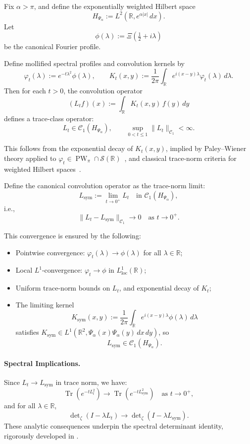 \begin{lemma}
\label{lem:trace_norm_convergence_Lt_to_Lsym}
Fix \( \alpha > \pi \), and define the exponentially weighted Hilbert space
\[
H_{\Psi_\alpha} := L^2(\mathbb{R}, e^{\alpha|x|}\, dx).
\]
Let
\[
\phi(\lambda) := \Xi\left( \tfrac{1}{2} + i\lambda \right)
\]
be the canonical Fourier profile.

Define mollified spectral profiles and convolution kernels by
\[
\varphi_t(\lambda) := e^{-t\lambda^2} \phi(\lambda), \qquad
K_t(x,y) := \frac{1}{2\pi} \int_{\mathbb{R}} e^{i(x - y)\lambda} \varphi_t(\lambda)\, d\lambda.
\]
Then for each \( t > 0 \), the convolution operator
\[
(L_t f)(x) := \int_{\mathbb{R}} K_t(x, y)\, f(y)\, dy
\]
defines a trace-class operator:
\[
L_t \in \mathcal{C}_1(H_{\Psi_\alpha}), \qquad \sup_{0 < t \le 1} \| L_t \|_{\mathcal{C}_1} < \infty.
\]

\medskip
\noindent
This follows from the exponential decay of \( K_t(x,y) \), implied by Paley--Wiener theory applied to \( \varphi_t \in \operatorname{PW}_\pi \cap \mathcal{S}(\mathbb{R}) \)~\cite[Thm.~IX.12]{ReedSimon1975II}, and classical trace-norm criteria for weighted Hilbert spaces~\cite[Ch.~4]{Simon2005TraceIdeals}.

\medskip
\noindent
Define the canonical convolution operator as the trace-norm limit:
\[
L_{\mathrm{sym}} := \lim_{t \to 0^+} L_t \quad \text{in } \mathcal{C}_1(H_{\Psi_\alpha}),
\]
i.e.,
\[
\| L_t - L_{\mathrm{sym}} \|_{\mathcal{C}_1} \to 0 \quad \text{as } t \to 0^+.
\]

\medskip
\noindent
This convergence is ensured by the following:
\begin{itemize}
  \item Pointwise convergence: \( \varphi_t(\lambda) \to \phi(\lambda) \) for all \( \lambda \in \mathbb{R} \);
  \item Local \( L^1 \)-convergence: \( \varphi_t \to \phi \) in \( L^1_{\mathrm{loc}}(\mathbb{R}) \);
  \item Uniform trace-norm bounds on \( L_t \), and exponential decay of \( K_t \);
  \item The limiting kernel
  \[
  K_{\mathrm{sym}}(x,y) := \frac{1}{2\pi} \int_{\mathbb{R}} e^{i(x-y)\lambda} \phi(\lambda)\, d\lambda
  \]
  satisfies \( K_{\mathrm{sym}} \in L^1(\mathbb{R}^2, \Psi_\alpha(x)\Psi_\alpha(y)\, dx\, dy) \), so
  \[
  L_{\mathrm{sym}} \in \mathcal{C}_1(H_{\Psi_\alpha}).
  \]
\end{itemize}

\paragraph{Spectral Implications.}
Since \( L_t \to L_{\mathrm{sym}} \) in trace norm, we have:
\[
\operatorname{Tr}\left(e^{-tL_t^2}\right) \to \operatorname{Tr}\left(e^{-tL_{\mathrm{sym}}^2}\right) \quad \text{as } t \to 0^+,
\]
and for all \( \lambda \in \mathbb{R} \),
\[
\det\nolimits_{\zeta}(I - \lambda L_t) \to \det\nolimits_{\zeta}(I - \lambda L_{\mathrm{sym}}).
\]
These analytic consequences underpin the spectral determinant identity, rigorously developed in .
\end{lemma}
